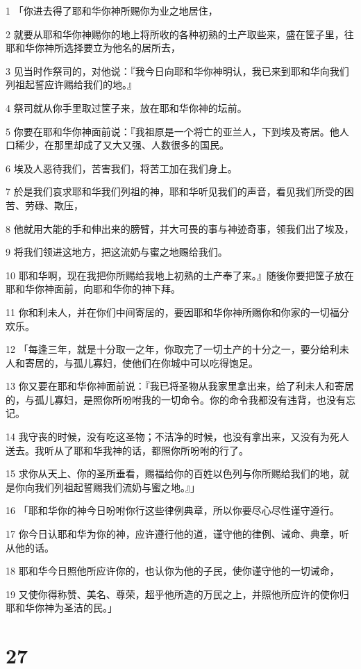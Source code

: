 \par 1 「你进去得了耶和华你神所赐你为业之地居住，
\par 2 就要从耶和华你神赐你的地上将所收的各种初熟的土产取些来，盛在筐子里，往耶和华你神所选择要立为他名的居所去，
\par 3 见当时作祭司的，对他说：『我今日向耶和华你神明认，我已来到耶和华向我们列祖起誓应许赐给我们的地。』
\par 4 祭司就从你手里取过筐子来，放在耶和华你神的坛前。
\par 5 你要在耶和华你神面前说：『我祖原是一个将亡的亚兰人，下到埃及寄居。他人口稀少，在那里却成了又大又强、人数很多的国民。
\par 6 埃及人恶待我们，苦害我们，将苦工加在我们身上。
\par 7 於是我们哀求耶和华我们列祖的神，耶和华听见我们的声音，看见我们所受的困苦、劳碌、欺压，
\par 8 他就用大能的手和伸出来的膀臂，并大可畏的事与神迹奇事，领我们出了埃及，
\par 9 将我们领进这地方，把这流奶与蜜之地赐给我们。
\par 10 耶和华啊，现在我把你所赐给我地上初熟的土产奉了来。』随後你要把筐子放在耶和华你神面前，向耶和华你的神下拜。
\par 11 你和利未人，并在你们中间寄居的，要因耶和华你神所赐你和你家的一切福分欢乐。
\par 12 「每逢三年，就是十分取一之年，你取完了一切土产的十分之一，要分给利未人和寄居的，与孤儿寡妇，使他们在你城中可以吃得饱足。
\par 13 你又要在耶和华你神面前说：『我已将圣物从我家里拿出来，给了利未人和寄居的，与孤儿寡妇，是照你所吩咐我的一切命令。你的命令我都没有违背，也没有忘记。
\par 14 我守丧的时候，没有吃这圣物；不洁净的时候，也没有拿出来，又没有为死人送去。我听从了耶和华我神的话，都照你所吩咐的行了。
\par 15 求你从天上、你的圣所垂看，赐福给你的百姓以色列与你所赐给我们的地，就是你向我们列祖起誓赐我们流奶与蜜之地。』」
\par 16 「耶和华你的神今日吩咐你行这些律例典章，所以你要尽心尽性谨守遵行。
\par 17 你今日认耶和华为你的神，应许遵行他的道，谨守他的律例、诫命、典章，听从他的话。
\par 18 耶和华今日照他所应许你的，也认你为他的子民，使你谨守他的一切诫命，
\par 19 又使你得称赞、美名、尊荣，超乎他所造的万民之上，并照他所应许的使你归耶和华你神为圣洁的民。」

\chapter{27}

